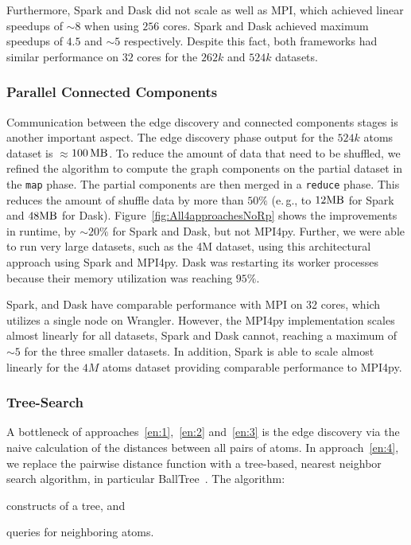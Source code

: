 Furthermore, Spark and Dask did not scale as well as MPI, which achieved linear speedups of $\sim8$ when using $256$ cores.
Spark and Dask achieved maximum speedups of $4.5$ and $\sim5$ respectively.
Despite this fact, both frameworks had similar performance on $32$ cores for the $262k$ and $524k$ datasets.


\subsubsection*{Parallel Connected Components}
Communication between the edge discovery and connected components stages is another important aspect.
The edge discovery phase output for the $524k$ atoms dataset is $\approx$$100\,\textup{MB}$.
To reduce the amount of data that need to be shuffled, we refined the algorithm to compute the graph components on the partial dataset in the \texttt{map} phase.
The partial components are then merged in a \texttt{reduce} phase.
This reduces the amount of shuffle data by more than $50\%$ (e.\,g., to $12\textup{MB}$ for Spark and $48\textup{MB}$ for Dask).
Figure~\ref{fig:All4approachesNoRp} shows the improvements in runtime, by $\sim20\%$ for Spark and Dask, but not MPI4py.
Further, we were able to run very large datasets, such as the 4M dataset, using this architectural approach using Spark and MPI4py.
Dask was restarting its worker processes because their memory utilization was reaching $95\%$.

Spark, and Dask have comparable performance with MPI on 32 cores, which utilizes a single node on Wrangler.
However, the MPI4py implementation scales almost linearly for all datasets, Spark and Dask cannot, reaching a maximum of $\sim5$ for the three smaller datasets.
In addition, Spark is able to scale almost linearly for the $4M$ atoms dataset providing comparable performance to MPI4py.


\subsubsection*{Tree-Search}
A bottleneck of approaches~\ref{en:1},~\ref{en:2} and~\ref{en:3} is the edge 
discovery via the naive calculation of the distances between all pairs of atoms. 
In approach~\ref{en:4}, we replace the pairwise distance function with a tree-based, 
nearest neighbor search algorithm, in particular BallTree~\cite{omohundro89five}. 
The algorithm: 
\begin{inparaenum}
    \item constructs of a tree, and
    \item queries for neighboring atoms.
\end{inparaenum}

